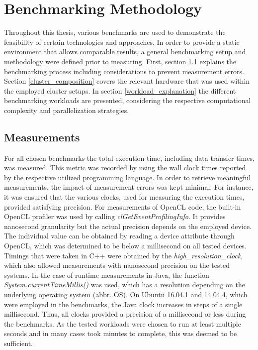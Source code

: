 \chapter{Benchmarking Methodology}
\label{benchmarking_methodology}
Throughout this thesis, various benchmarks are used to demonstrate the feasibility of certain technologies and approaches. In order to provide a static environment that allows comparable results, a general benchmarking setup and methodology were defined prior to measuring. First, section \ref{measurements} explains the benchmarking process including considerations to prevent measurement errors. Section \ref{cluster_composition} covers the relevant hardware that was used within the employed cluster setups. In section \ref{workload_explanation} the different benchmarking workloads are presented, considering the respective computational complexity and parallelization strategies.

\section{Measurements}
\label{measurements}
For all chosen benchmarks the total execution time, including data transfer times, was measured. This metric was recorded by using the wall clock times reported by the respective utilized programming language. In order to retrieve meaningful measurements, the impact of measurement errors was kept minimal. For instance, it was ensured that the various clocks, used for measuring the execution times, provided satisfying precision. For measurements of OpenCL code, the built-in OpenCL profiler was used by calling \textit{clGetEventProfilingInfo}. It provides nanosecond granularity but the actual precision depends on the employed device\cite{cl_profiling}. The individual value can be obtained by reading a device attribute through OpenCL, which was determined to be below a millisecond on all tested devices. Timings that were taken in C++ were obtained by the \textit{high\_resolution\_clock}, which also allowed measurements with nanosecond precision on the tested systems. In the case of runtime measurements in Java, the function \textit{System.currentTimeMillis()} was used, which has a resolution depending on the underlying operating system (abbr. OS)\cite{oracle_system}. On Ubuntu 16.04.1 and 14.04.4, which were employed in the benchmarks, the Java clock increases in steps of a single millisecond. Thus, all clocks provided a precision of a millisecond or less during the benchmarks. As the tested workloads were chosen to run at least multiple seconds and in many cases took minutes to complete, this was deemed to be sufficient.

